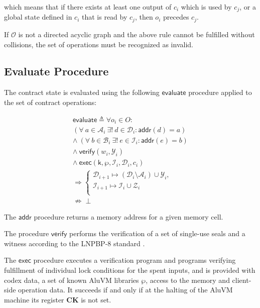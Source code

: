 \documentclass[9pt,oneside]{amsart}
\begin{document}
\begin{multicols}{2}
which means that if there exists at least one output of $c_i$ which is used by $c_j$, or a global
state defined in $c_i$ that is read by $c_j$, then $o_i$ precedes $c_j$.

If $\mathcal{O}$ is not a directed acyclic graph and the above rule cannot be fulfilled without
collisions, the set of operations must be recognized as invalid.


\subsection{Evaluate Procedure}\label{Evaluate}

The contract state is evaluated using the following $\mathsf{evaluate}$ procedure applied to the set of
contract operations:

\begin{equation}\label{eq:evaluate}
\begin{split}
\mathsf{evaluate} \triangleq \forall o_i \in O: \\
(\forall \ a \in \mathcal{A}_i \ \exists! \ d \in \mathcal{D}_i: \mathsf{addr}(d) = a) \\
\wedge \ (\forall \ b \in \mathcal{B}_i \ \exists! \ e \in \mathcal{I}_i: \mathsf{addr}(e) = b) \\
\wedge \ \mathsf{verify}(w_i, \mathcal{Y}_i) \\
\wedge \ \mathsf{exec}(\mathsf{k}, \wp, \mathcal{I}_i, \mathcal{D}_i, c_i) \\
\Rightarrow 
\begin{cases}
    \mathcal{D}_{i+1} \mapsto (\mathcal{D}_i \setminus \mathcal{A}_i) \cup \mathcal{Y}_i, \\[6pt]
    \mathcal{I}_{i+1} \mapsto \mathcal{I}_i \cup \mathcal{Z}_i \\
\end{cases} \\
\nRightarrow \perp
\end{split}
\end{equation}

The $\mathsf{addr}$ procedure returns a memory address for a given memory cell.

The procedure $\mathsf{verify}$ performs the verification of a set of single-use seals and a witness
according to the LNPBP-8 standard \cite{LNPBP8}.

The $\mathsf{exec}$ procedure executes a verification program
and programs verifying fulfillment of individual lock conditions for the spent inputs,
and is provided with codex data, a set of known AluVM libraries $\wp$,
access to the memory and client-side operation data.
It succeeds if and only if at the halting of the AluVM machine its register \textbf{CK} is not set.


\end{multicols}
\end{document}
